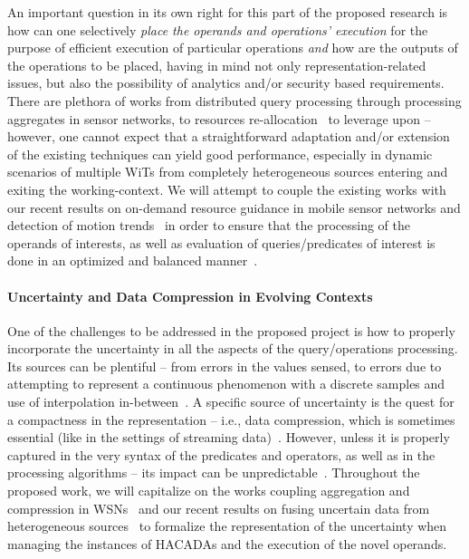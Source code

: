 An important question in its own right for this part of the proposed research is how can one selectively {\it place the operands and operations' execution} for the purpose of efficient execution of particular operations {\it and} how are the outputs of the operations to be placed, having in mind not only representation-related issues, but also the possibility of analytics and/or security based requirements. There are plethora of works from distributed query processing through processing aggregates in sensor networks, to resources re-allocation~\cite{DewanSHH94,GuoPZA14,JinC06,LiuOBC12,Nisheeth04,Synopsis} to leverage upon -- however, one cannot expect that a straightforward adaptation and/or extension of the existing techniques can yield good performance, especially in dynamic scenarios of multiple WiTs from completely heterogeneous sources entering and exiting the working-context. We will attempt to couple the existing works with our recent results on on-demand resource guidance in mobile sensor networks and detection of motion trends~\cite{AvciTTSZ16,MohamedKT15} in order to ensure that the processing of the operands of interests, as well as evaluation of queries/predicates of interest is done in an optimized and balanced manner~\cite{omCom16-1}.




\paragraph{Uncertainty and Data Compression in Evolving Contexts}


One of the challenges to be addressed in the proposed project is how to properly incorporate the uncertainty in all the aspects of the query/operations processing. Its sources can be plentiful -- from errors in the values sensed, to errors due to attempting to represent a continuous phenomenon with a discrete samples and use of interpolation in-between~\cite{DevendranL14,GoodchildZK09,HunterG96}. A specific source of uncertainty is the quest for a compactness in the representation -- i.e., data compression, which is sometimes essential (like in the settings of streaming data)~\cite{CormodeMYZ12,CormodeGHJ12}. 
However, unless it is properly captured in the very syntax of the predicates and operators, as well as in the processing algorithms -- its impact can be unpredictable~\cite{MyTODS04}. Throughout the proposed work, we will capitalize on the works coupling aggregation and compression in WSNs~\cite{LinGKL05,KadayifK04,PattemKG08} and our recent results on fusing uncertain data from heterogeneous sources~\cite{ZhangTL16} to formalize the representation of the uncertainty when managing the instances of HACADAs and the execution of the novel operands.

